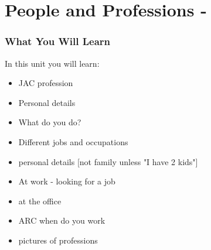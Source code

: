 \cite{walcpp49}
\index{}
\chapter*{People and Professions - }
\subsection{What You Will Learn}
In this unit you will learn:
\begin{itemize}
\item JAC profession
\item Personal details
\item What do you do?
\item Different jobs and occupations
\item personal details [not family unless "I have 2 kids"]
\item At work - looking for a job
\item at the office
\item ARC when do you work
\item pictures of professions
\end{itemize}\newpage

